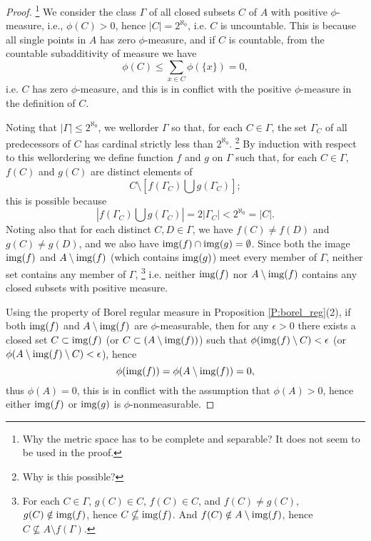 \begin{proof}   %
\footnote{Why the metric space has to be complete and separable? It does not
    seem to be used in the proof.}
We consider the class $\Gamma$ of all closed subsets $C$ of $A$ with positive
$\phi$-measure, i.e., $\phi(C)>0$, hence $|C|=2^{\aleph_0}$, i.e. $C$ is 
uncountable. This is because all single points in $A$ has zero $\phi$-measure,
and if $C$ is countable, from the countable subadditivity of measure we have
\[
  \phi(C) \le \sum_{x\in C} \phi(\{x\}) = 0,
\]
i.e. $C$ has zero $\phi$-measure, and this is in conflict with the positive
$\phi$-measure in the definition of $C$.

Noting that $|\Gamma |\le 2^{\aleph_0}$, we wellorder $\Gamma$ so that, for each
$C\in \Gamma$, the set $\Gamma_C$ of all predecessors of $C$ has cardinal
strictly less than $2^{\aleph_0}$. 
\footnote{Why is this possible?}
By induction with respect to this wellordering we define function $f$ and $g$ on
$\Gamma$ such that, for each $C\in\Gamma$, $f(C)$ and $g(C)$ are distinct
elements of
\[
  C\setminus [f(\Gamma_C) \bigcup g(\Gamma_C)];
\]
this is possible because
\[
  |f(\Gamma_C) \bigcup g(\Gamma_C)| =2 |\Gamma_C| < 2^{\aleph_0}=|C|.
\]
Noting also that for each distinct $C,D\in\Gamma$, we have $f(C)\neq f(D)$ and 
$g(C)\neq g(D)$, and we also have $\operatorname*{img}(f)\cap \operatorname*{img}(g)=\emptyset$.
Since both the image $\operatorname*{img}(f)$ and $A\setminus\operatorname*{img}(f)$ (which contains $\operatorname*{img}(g)$) meet 
every member of $\Gamma$, neither set contains any member of $\Gamma$,
\footnote{For each $C\in\Gamma$, $g(C)\in C$, $f(C)\in C$, and $f(C)\neq g(C)$,
  $g(C)\notin \operatorname*{img}(f)$, hence $C\nsubseteq \operatorname*{img}(f)$. And 
  $f(C)\notin A\setminus\operatorname*{img}(f)$, hence $C\nsubseteq A\setminus f(\Gamma)$.}
i.e. neither $\operatorname*{img}(f)$ nor $A\setminus\operatorname*{img}(f)$ contains any closed subsets with
positive measure. 

Using the property of Borel regular measure in Proposition \ref{P:borel_reg}(2),
if both $\operatorname*{img}(f)$ and $A\setminus\operatorname*{img}(f)$ are $\phi$-measurable, then for any
$\epsilon>0$ there exists a closed set $C\subset \operatorname*{img}(f)$ (or 
$C\subset (A\setminus\operatorname*{img}(f))$) such that $\phi(\operatorname*{img}(f)\setminus C)<\epsilon$
(or $\phi(A\setminus\operatorname*{img}(f)\setminus C)<\epsilon$), hence 
\[
  \phi(\operatorname*{img}(f)) = \phi(A\setminus\operatorname*{img}(f))=0,
\]
thus $\phi(A)=0$, this is in conflict with the assumption that $\phi(A)>0$,
hence either $\operatorname*{img}(f)$ or $\operatorname*{img}(g)$ is $\phi$-nonmeasurable.

\end{proof}   %




